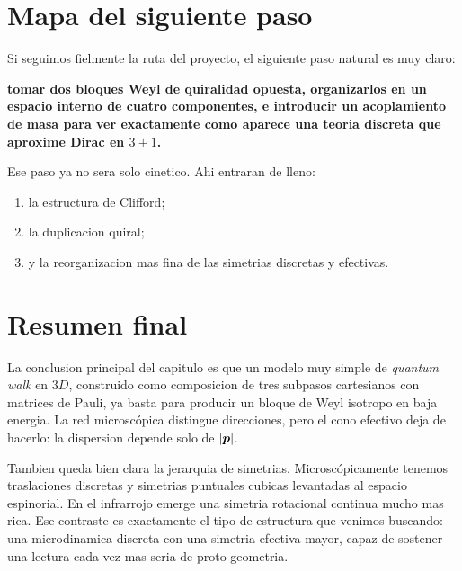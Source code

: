 \section{Mapa del siguiente paso}
Si seguimos fielmente la ruta del proyecto, el siguiente paso natural es muy claro:
\begin{displayquote}
\textbf{tomar dos bloques Weyl de quiralidad opuesta, organizarlos en un espacio interno de cuatro componentes, e introducir un acoplamiento de masa para ver exactamente como aparece una teoria discreta que aproxime Dirac en \(3+1\).}
\end{displayquote}

Ese paso ya no sera solo cinetico. Ahi entraran de lleno:
\begin{enumerate}[label=\arabic*.]
    \item la estructura de Clifford;
    \item la duplicacion quiral;
    \item y la reorganizacion mas fina de las simetrias discretas y efectivas.
\end{enumerate}

\section{Resumen final}
La conclusion principal del capitulo es que un modelo muy simple de \textit{quantum walk} en \(3D\), construido como composicion de tres subpasos cartesianos con matrices de Pauli, ya basta para producir un bloque de Weyl isotropo en baja energia. La red microscópica distingue direcciones, pero el cono efectivo deja de hacerlo: la dispersion depende solo de \(\abs{\bm{p}}\).

Tambien queda bien clara la jerarquia de simetrias. Microscópicamente tenemos traslaciones discretas y simetrias puntuales cubicas levantadas al espacio espinorial. En el infrarrojo emerge una simetria rotacional continua mucho mas rica. Ese contraste es exactamente el tipo de estructura que venimos buscando: una microdinamica discreta con una simetria efectiva mayor, capaz de sostener una lectura cada vez mas seria de proto-geometria.
